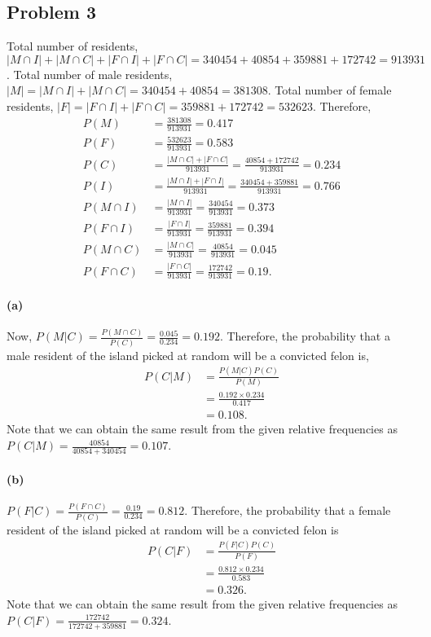 \subsection*{Problem 3}
Total number of residents, $|M \cap I| + |M \cap C| + |F \cap I| + |F \cap C| = 340454+40854+359881+172742 = 913931$. Total number of male residents, $|M| = |M \cap I| + |M \cap C| = 340454+40854 = 381308$.
\newline
Total number of female residents, $|F| = |F \cap I| + |F \cap C| = 359881+172742 = 532623$.
\newline
Therefore,
\begin{align*}
	P(M) &= \frac{381308}{913931} = 0.417\\
	P(F) &= \frac{532623}{913931} = 0.583\\
	P(C) &= \frac{|M \cap C|+|F \cap C|}{913931} = \frac{40854+172742}{913931} = 0.234\\
	P(I) &= \frac{|M \cap I|+|F \cap I|}{913931} = \frac{340454+359881}{913931} = 0.766\\
	P(M \cap I) &= \frac{|M \cap I|}{913931} = \frac{340454}{913931} = 0.373\\
	P(F \cap I) &= \frac{|F \cap I|}{913931} = \frac{359881}{913931} = 0.394\\
	P(M \cap C) &= \frac{|M \cap C|}{913931} = \frac{40854}{913931} = 0.045\\
	P(F \cap C) &= \frac{|F \cap C|}{913931} = \frac{172742}{913931} = 0.19.
\end{align*}
\paragraph{(a)} Now, $P(M|C) = \frac{P(M \cap C)}{P(C)} = \frac{0.045}{0.234} = 0.192$. Therefore, the probability that a male resident of the island picked at random will be a convicted felon is,
\begin{align*}
	P(C|M) &= \frac{P(M|C)P(C)}{P(M)}\\
	&= \frac{0.192 \times 0.234}{0.417}\\
	&= 0.108.
\end{align*}
Note that we can obtain the same result from the given relative frequencies as $P(C|M) = \frac{40854}{40854+340454} = 0.107$.
\paragraph{(b)}$P(F|C) = \frac{P(F \cap C)}{P(C)} = \frac{0.19}{0.234} = 0.812$. Therefore, the probability that a female resident of the island picked at random will be
a convicted felon is
\begin{align*}
	P(C|F) &= \frac{P(F|C)P(C)}{P(F)}\\
	&= \frac{0.812 \times 0.234}{0.583}\\
	&= 0.326.
\end{align*}
Note that we can obtain the same result from the given relative frequencies as $P(C|F) = \frac{172742}{172742+359881} = 0.324$.
